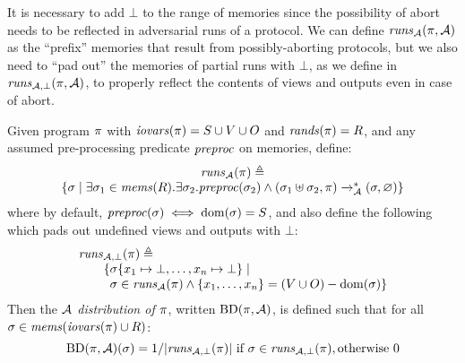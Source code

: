 It is necessary to add $\bot$ to the range of memories since
the possibility of abort needs to be reflected in adversarial
runs of a protocol. We can define $\mathit{runs}_{\mathcal{A}}(\pi,\mathcal{A})$
as the ``prefix'' memories that result from possibly-aborting
protocols, but we also need to ``pad out'' the memories
of partial runs with $\bot$, as we define in $\mathit{runs}_{\mathcal{A},\bot}(\pi,\mathcal{A})$,
to properly reflect the contents of views and outputs even in case of abort. 
\begin{definition}
  \label{def-aprogd}
  \label{def-aprogtt}
  \label{definition-aprogd}
  Given program $\pi$ with $\mathit{iovars}(\pi) = S \cup V \cup O$ and $\mathit{rands}(\pi) = R$, and
  any assumed pre-processing predicate $\mathit{preproc}$ on memories, define:
  $$
  \begin{array}{c}
    \mathit{runs}_{\mathcal{A}}(\pi) \triangleq \\
    \{ \sigma \mid \exists \sigma_1 \in \mathit{mems}(R) . 
    \exists \sigma_2 . \mathit{preproc}(\sigma_2) \wedge
    (\sigma_1 \uplus \sigma_2,\pi) \xrightarrow{}^{*}_{\mathcal{A}} (\sigma,\varnothing) \}
  \end{array}
  $$
  where by default, $\mathit{preproc}(\sigma) \iff \mathrm{dom}(\sigma) = S$, and also define the following
  which pads out undefined views and outputs with $\bot$:
  $$
  \begin{array}{l}
    \botruns(\prog) \defeq \\
    \qquad \{ \store\{ x_1 \mapsto \bot, \ldots, x_n \mapsto \bot \} \mid \\
    \qquad \phantom{\{} \store \in \aruns(\prog) \wedge \{ x_1,\ldots,x_n\} = (V \cup O) - \dom(\store) \}
  \end{array}
  $$
  Then the \emph{$\mathcal{A}$ distribution of $\pi$}, written $\mathrm{BD}(\pi,\mathcal{A})$, is
  defined such that for all $\sigma \in \mathit{mems}(\mathit{iovars}(\pi) \cup R)$:
  $$
  \mathrm{BD}(\pi,\mathcal{A})(\sigma) =  1 / |\mathit{runs}_{\mathcal{A},\bot}(\pi)| \ \text{if}\ \sigma \in \mathit{runs}_{\mathcal{A},\bot}(\pi), \text{otherwise}\ 0
  $$
\end{definition}

